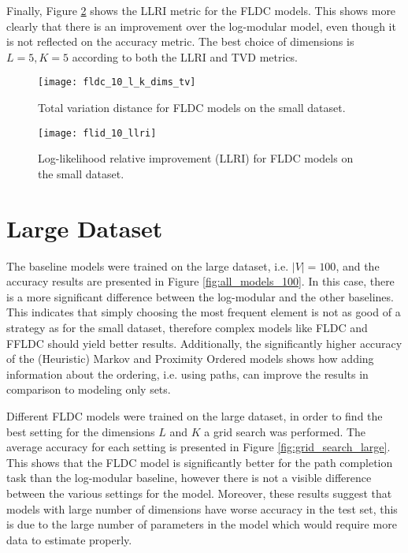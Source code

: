 Finally, Figure \ref{fig:small_llri} shows the LLRI metric for the FLDC models. This shows more clearly that there is an improvement over the log-modular model, even though it is not reflected on the accuracy metric. The best choice of dimensions is $L=5,K=5$ according to both the LLRI and TVD metrics.

\begin{figure}
  \centering
  \texttt{[image: fldc\_10\_l\_k\_dims\_tv]}
  \caption{Total variation distance for FLDC models on the small dataset.}
  \label{fig:small_tv_comparison}
\end{figure}

\begin{figure}
  \centering
  \texttt{[image: flid\_10\_llri]}
  \caption{Log-likelihood relative improvement (LLRI) for FLDC models on the small dataset.}
  \label{fig:small_llri}
\end{figure}

\section{Large Dataset}

The baseline models were trained on the large dataset, i.e. $|V| = 100$, and the accuracy results are presented in Figure \ref{fig:all_models_100}. In this case, there is a more significant difference between the log-modular and the other baselines. This indicates that simply choosing the most frequent element is not as good of a strategy as for the small dataset, therefore complex models like FLDC and FFLDC should yield better results. Additionally, the significantly higher accuracy of the (Heuristic) Markov and Proximity Ordered models shows how adding information about the ordering, i.e. using paths, can improve the results in comparison to modeling only sets.

Different FLDC models were trained on the large dataset, in order to find the best setting for the dimensions $L$ and $K$ a grid search was performed. The average accuracy for each setting is presented in Figure \ref{fig:grid_search_large}. This shows that the FLDC model is significantly better for the path completion task than the log-modular baseline, however there is not a visible difference between the various settings for the model. Moreover, these results suggest that models with large number of dimensions have worse accuracy in the test set, this is due to the large number of parameters in the model which would require more data to estimate properly.

